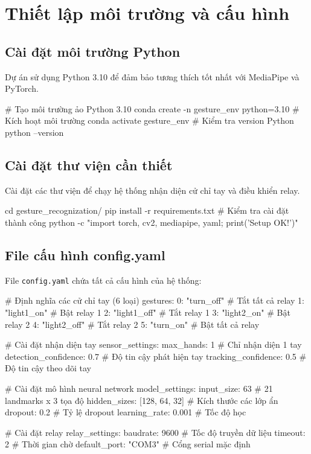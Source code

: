 \section{Thiết lập môi trường và cấu hình}

\subsection{Cài đặt môi trường Python}
Dự án sử dụng Python 3.10 để đảm bảo tương thích tốt nhất với MediaPipe và PyTorch.

\begin{aivncodebox}
\begin{python}
# Tạo môi trường ảo Python 3.10
conda create -n gesture_env python=3.10
# Kích hoạt môi trường
conda activate gesture_env
# Kiểm tra version Python
python --version
\end{python}
\end{aivncodebox}

\subsection{Cài đặt thư viện cần thiết}
Cài đặt các thư viện để chạy hệ thống nhận diện cử chỉ tay và điều khiển relay.

\begin{aivncodebox}
\begin{python}
cd gesture_recognization/
pip install -r requirements.txt
# Kiểm tra cài đặt thành công
python -c "import torch, cv2, mediapipe, yaml; print('Setup OK!')"
\end{python}
\end{aivncodebox}

\subsection{File cấu hình config.yaml}
File \texttt{config.yaml} chứa tất cả cấu hình của hệ thống:

\begin{aivncodebox}
\begin{python}
# Định nghĩa các cử chỉ tay (6 loại)
gestures:
  0: "turn_off"      # Tắt tất cả relay
  1: "light1_on"     # Bật relay 1
  2: "light1_off"    # Tắt relay 1  
  3: "light2_on"     # Bật relay 2
  4: "light2_off"    # Tắt relay 2
  5: "turn_on"       # Bật tất cả relay

# Cài đặt nhận diện tay
sensor_settings:
  max_hands: 1                  # Chỉ nhận diện 1 tay
  detection_confidence: 0.7     # Độ tin cậy phát hiện tay
  tracking_confidence: 0.5      # Độ tin cậy theo dõi tay

# Cài đặt mô hình neural network
model_settings:
  input_size: 63               # 21 landmarks x 3 tọa độ
  hidden_sizes: [128, 64, 32]  # Kích thước các lớp ẩn
  dropout: 0.2                 # Tỷ lệ dropout
  learning_rate: 0.001         # Tốc độ học

# Cài đặt relay
relay_settings:
  baudrate: 9600              # Tốc độ truyền dữ liệu
  timeout: 2                  # Thời gian chờ
  default_port: "COM3"        # Cổng serial mặc định
\end{python}
\end{aivncodebox}

